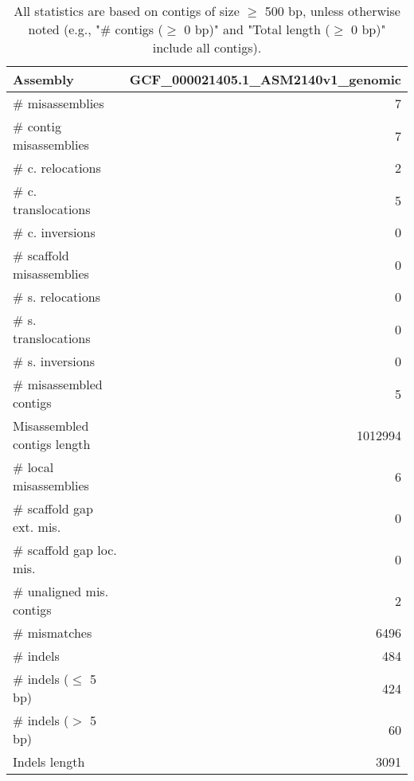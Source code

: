 \documentclass[12pt,a4paper]{article}
\begin{document}
\begin{table}[ht]
\begin{center}
\caption{All statistics are based on contigs of size $\geq$ 500 bp, unless otherwise noted (e.g., "\# contigs ($\geq$ 0 bp)" and "Total length ($\geq$ 0 bp)" include all contigs).}
\begin{tabular}{|l*{1}{|r}|}
\hline
Assembly & GCF\_000021405.1\_ASM2140v1\_genomic \\ \hline
\# misassemblies & 7 \\ \hline
\hspace{2mm}\# contig misassemblies & 7 \\ \hline
\hspace{5mm}\# c. relocations & 2 \\ \hline
\hspace{5mm}\# c. translocations & 5 \\ \hline
\hspace{5mm}\# c. inversions & 0 \\ \hline
\hspace{2mm}\# scaffold misassemblies & 0 \\ \hline
\hspace{5mm}\# s. relocations & 0 \\ \hline
\hspace{5mm}\# s. translocations & 0 \\ \hline
\hspace{5mm}\# s. inversions & 0 \\ \hline
\# misassembled contigs & 5 \\ \hline
Misassembled contigs length & 1012994 \\ \hline
\# local misassemblies & 6 \\ \hline
\# scaffold gap ext. mis. & 0 \\ \hline
\# scaffold gap loc. mis. & 0 \\ \hline
\# unaligned mis. contigs & 2 \\ \hline
\# mismatches & 6496 \\ \hline
\# indels & 484 \\ \hline
\hspace{5mm}\# indels ($\leq$ 5 bp) & 424 \\ \hline
\hspace{5mm}\# indels ($>$ 5 bp) & 60 \\ \hline
Indels length & 3091 \\ \hline
\end{tabular}
\end{center}
\end{table}
\end{document}
